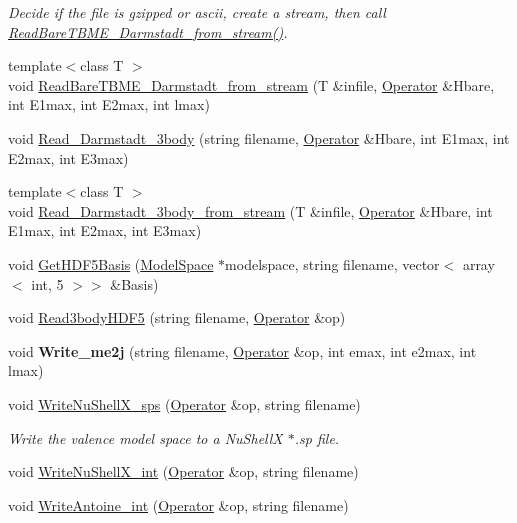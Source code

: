 \begin{DoxyCompactItemize}
\begin{DoxyCompactList}\small\item\em Decide if the file is gzipped or ascii, create a stream, then call \hyperlink{classReadWrite_a44acf6835321a8bee6a795523728da2e}{Read\-Bare\-T\-B\-M\-E\-\_\-\-Darmstadt\-\_\-from\-\_\-stream()}. \end{DoxyCompactList}\item 
{\footnotesize template$<$class T $>$ }\\void \hyperlink{classReadWrite_a44acf6835321a8bee6a795523728da2e}{Read\-Bare\-T\-B\-M\-E\-\_\-\-Darmstadt\-\_\-from\-\_\-stream} (T \&infile, \hyperlink{classOperator}{Operator} \&Hbare, int E1max, int E2max, int lmax)
\item 
void \hyperlink{classReadWrite_a84c0cbaf2be415eadffb560ea0bb9785}{Read\-\_\-\-Darmstadt\-\_\-3body} (string filename, \hyperlink{classOperator}{Operator} \&Hbare, int E1max, int E2max, int E3max)
\item 
{\footnotesize template$<$class T $>$ }\\void \hyperlink{classReadWrite_af229332b05276f686966fdaaa98a81fd}{Read\-\_\-\-Darmstadt\-\_\-3body\-\_\-from\-\_\-stream} (T \&infile, \hyperlink{classOperator}{Operator} \&Hbare, int E1max, int E2max, int E3max)
\item 
void \hyperlink{classReadWrite_ad03f489c69c98d3ff1d33fbe9801c3d1}{Get\-H\-D\-F5\-Basis} (\hyperlink{classModelSpace}{Model\-Space} $\ast$modelspace, string filename, vector$<$ array$<$ int, 5 $>$$>$ \&Basis)
\item 
void \hyperlink{classReadWrite_a52656073ac0fa73c78dbd67c0f0e81e3}{Read3body\-H\-D\-F5} (string filename, \hyperlink{classOperator}{Operator} \&op)
\item 
\hypertarget{classReadWrite_ac4e620913e1aa49ef541d2a0b7c631c5}{void {\bfseries Write\-\_\-me2j} (string filename, \hyperlink{classOperator}{Operator} \&op, int emax, int e2max, int lmax)}\label{classReadWrite_ac4e620913e1aa49ef541d2a0b7c631c5}

\item 
\hypertarget{classReadWrite_a8a7dc85b22c8f468d153d3fde9f39394}{void \hyperlink{classReadWrite_a8a7dc85b22c8f468d153d3fde9f39394}{Write\-Nu\-Shell\-X\-\_\-sps} (\hyperlink{classOperator}{Operator} \&op, string filename)}\label{classReadWrite_a8a7dc85b22c8f468d153d3fde9f39394}

\begin{DoxyCompactList}\small\item\em Write the valence model space to a Nu\-Shell\-X $\ast$.sp file. \end{DoxyCompactList}\item 
void \hyperlink{classReadWrite_a2028159ab7f8c227613834b39794e157}{Write\-Nu\-Shell\-X\-\_\-int} (\hyperlink{classOperator}{Operator} \&op, string filename)
\item 
\hypertarget{classReadWrite_a371194595d9412cbb8f1b432a6526f5a}{void \hyperlink{classReadWrite_a371194595d9412cbb8f1b432a6526f5a}{Write\-Antoine\-\_\-int} (\hyperlink{classOperator}{Operator} \&op, string filename)}\label{classReadWrite_a371194595d9412cbb8f1b432a6526f5a}


\end{DoxyCompactItemize}
